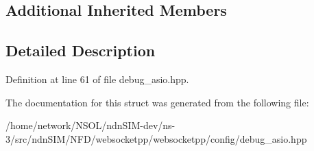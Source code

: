 \subsection*{Additional Inherited Members}


\subsection{Detailed Description}


Definition at line 61 of file debug\+\_\+asio.\+hpp.



The documentation for this struct was generated from the following file\+:\begin{DoxyCompactItemize}
\item 
/home/network/\+N\+S\+O\+L/ndn\+S\+I\+M-\/dev/ns-\/3/src/ndn\+S\+I\+M/\+N\+F\+D/websocketpp/websocketpp/config/debug\+\_\+asio.\+hpp\end{DoxyCompactItemize}
